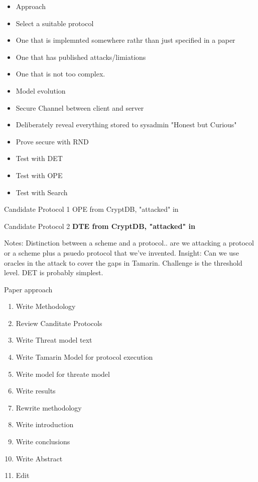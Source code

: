\documentclass[journal]{IEEEtran}
\begin{document}
\begin{itemize}
\item Approach
\item Select a suitable protocol
  \item 	One that is implemnted somewhere rathr than just specified in a paper
  \item 	One that has published attacks/limiations
  \item 	One that is not too complex.
\item Model evolution
  \item 		Secure Channel between client and server
  \item 		Deliberately reveal everything stored to sysadmin "Honest but Curious"
  \item 		Prove secure with RND
  \item 		Test with DET
  \item 		Test with OPE
  \item 		Test with Search
\end{itemize}



Candidate Protocol 1
	OPE from CryptDB, "attacked" in \cite{InfrenceAttacks}

Candidate Protocol 2
	\textbf{DTE from CryptDB, "attacked" in \cite{InfrenceAttacks}}


Notes:
Distinction between a scheme and a protocol.. are we attacking a protocol or a scheme plus a psuedo protocol that we've invented.
Insight: Can we use oracles in the attack to cover the gaps in Tamarin. 
Challenge is the threshold level.
DET is probably simplest.

	Paper approach
\begin{enumerate}
\item 		Write Methodology
\item 		Review Canditate Protocols
\item 		Write Threat model text
\item 		Write Tamarin Model for protocol execution
\item 		Write model for threate model
\item 		Write results
\item 		Rewrite methodology
\item 		Write introduction
\item 		Write conclusions
\item 		Write Abstract
\item 		Edit
\end{enumerate}
\end{document}
